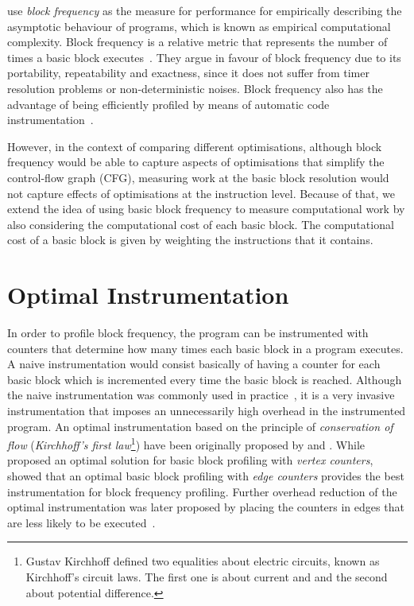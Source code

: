 \cite{goldsmith07} use \textit{block frequency} as the measure for performance for empirically describing the asymptotic behaviour of programs, which is known as empirical computational complexity.
Block frequency is a relative metric that represents the number of times a basic block executes~\citep{ball94,ball96}.
They argue in favour of block frequency due to its portability, repeatability and exactness, since it does not suffer from timer resolution problems or non-deterministic noises.
Block frequency also has the advantage of being efficiently profiled by means of automatic code instrumentation~\citep{knuth73,ball94}.

However, in the context of comparing different optimisations, although block frequency would be able to capture aspects of optimisations that simplify the control-flow graph (CFG), measuring work at the basic block resolution would not capture effects of optimisations at the instruction level.
Because of that, we extend the idea of using basic block frequency to measure computational work by also considering the computational cost of each basic block.
The computational cost of a basic block is given by weighting the instructions that it contains.

\section{Optimal Instrumentation} \label{subsec:optimalInstrumentation}

In order to profile  block frequency, the program can be instrumented with counters that determine how many times each basic block in a program executes.
A naive instrumentation would consist basically of having a counter for each basic block which is incremented every time the basic block is reached.
Although the naive instrumentation was commonly used in practice~\citep{knuth71}, it is a very invasive instrumentation that imposes an unnecessarily high overhead in the instrumented program.
An optimal instrumentation based on the principle of \textit{conservation of flow} (\textit{Kirchhoff's first law}\footnote{Gustav Kirchhoff defined two equalities about electric circuits, known as Kirchhoff's circuit laws. The first one is about current and and the second about potential difference.}) have been originally proposed by \cite{nahapetian73} and \cite{knuth73}.
While \cite{knuth73} proposed an optimal solution for basic block profiling with \textit{vertex counters}, \cite{ball94} showed that an optimal basic block profiling with \textit{edge counters} provides the best instrumentation for block frequency profiling.
Further overhead reduction of the optimal instrumentation was later proposed by placing the counters in edges that are less likely to be executed~\cite{forman81,ball94}.

